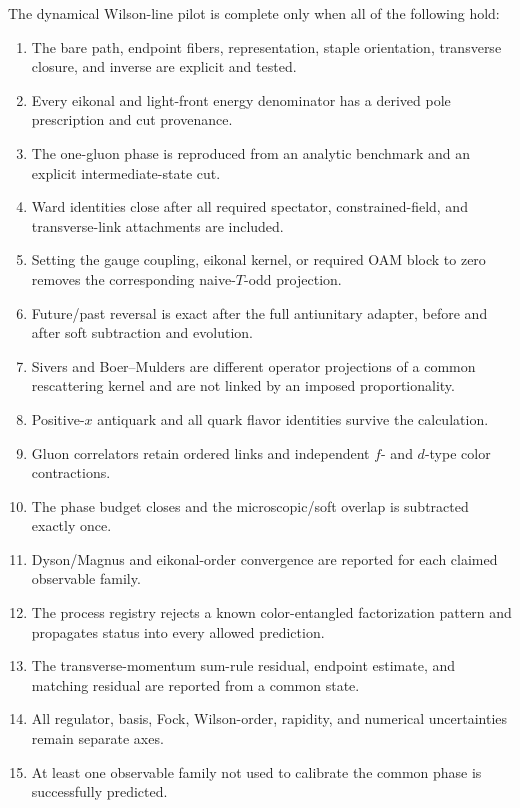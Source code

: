 \documentclass[11pt]{article}
\begin{document}
The dynamical Wilson-line pilot is complete only when all of the following
hold:
\begin{enumerate}
\item The bare path, endpoint fibers, representation, staple orientation,
      transverse closure, and inverse are explicit and tested.
\item Every eikonal and light-front energy denominator has a derived pole
      prescription and cut provenance.
\item The one-gluon phase is reproduced from an analytic benchmark and an
      explicit intermediate-state cut.
\item Ward identities close after all required spectator, constrained-field,
      and transverse-link attachments are included.
\item Setting the gauge coupling, eikonal kernel, or required OAM block to zero
      removes the corresponding naive-\(T\)-odd projection.
\item Future/past reversal is exact after the full antiunitary adapter, before
      and after soft subtraction and evolution.
\item Sivers and Boer--Mulders are different operator projections of a common
      rescattering kernel and are not linked by an imposed proportionality.
\item Positive-\(x\) antiquark and all quark flavor identities survive the
      calculation.
\item Gluon correlators retain ordered links and independent \(f\)- and
      \(d\)-type color contractions.
\item The phase budget closes and the microscopic/soft overlap is subtracted
      exactly once.
\item Dyson/Magnus and eikonal-order convergence are reported for each claimed
      observable family.
\item The process registry rejects a known color-entangled factorization
      pattern and propagates status into every allowed prediction.
\item The transverse-momentum sum-rule residual, endpoint estimate, and
      matching residual are reported from a common state.
\item All regulator, basis, Fock, Wilson-order, rapidity, and numerical
      uncertainties remain separate axes.
\item At least one observable family not used to calibrate the common phase is
      successfully predicted.
\end{enumerate}
\end{document}
